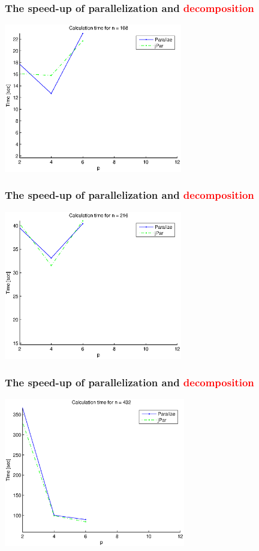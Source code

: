 \documentclass{beamer}
\begin{document}
\begin{frame}
\frametitle{The speed-up of parallelization and \textcolor{red}{decomposition}}
\centering
\includegraphics[height=6.5cm]{fig1}
\end{frame}
\begin{frame}
\frametitle{The speed-up of parallelization and \textcolor{red}{decomposition}}
\centering
\includegraphics[height=6.5cm]{fig2}
\end{frame}
\begin{frame}
\frametitle{The speed-up of parallelization and \textcolor{red}{decomposition}}
\centering
\includegraphics[height=6.5cm]{fig3}
\end{frame}
\end{document}
